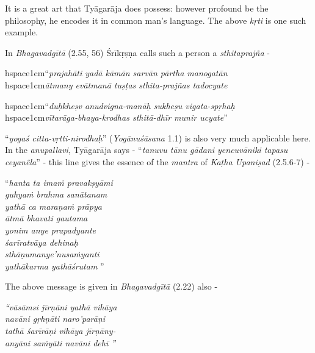 It is a great art that Tyāgarāja does possess: however profound be the philosophy, he encodes it in common man’s language. The above \textit{kṛti} is one such example. 

In \textit{Bhagavadgītā} (2.55, 56) Śrīkṛṣṇa calls such a person a \textit{sthitaprajña} -

\begin{myquote}
hspace{1cm}“\textit{prajahāti yadā kāmān sarvān pārtha manogatān }\\ hspace{1cm}\textit{ātmany evātmanā tuṣṭas sthita-prajñas tadocyate} 
\end{myquote}

\begin{myquote}
hspace{1cm}“\textit{duḥkheṣv anudvigna-manāḥ sukheṣu vigata-spṛhaḥ }\\ hspace{1cm}\textit{vītarāga-bhaya-krodhas sthitā-dhīr munir ucyate}”  
\end{myquote}

“\textit{yogaś citta-vṛtti-nirodhaḥ}” (\textit{Yogānuśāsana} 1.1) is also very much applicable here. In the \textit{anupallavi}, Tyāgarāja says - “\textit{tanuvu tānu gādani yencuvāniki tapasu ceyanêla}” - this line gives the essence of the \textit{mantra} of \textit{Kaṭha Upaniṣad} (2.5.6-7) -

\begin{centerquote}
“\textit{hanta ta imaṁ pravakṣyāmi}\\ \textit{guhyaṁ brahma sanātanam }\\ \textit{yathā ca maraṇaṁ prāpya}\\ \textit{ātmā bhavati gautama }\\ \textit{yonim anye prapadyante}\\ \textit{śarīratvāya dehinaḥ }\\ \textit{sthāṇumanye’nusaṁyanti}\\ \textit{yathākarma yathāśrutam} ”
\end{centerquote}

The above message is given in \textit{Bhagavadgītā} (2.22) also -

\begin{centerquote}
\textit{“vāsāmsi jīrṇāni yathā vihāya}\\ \textit{navāni gṛhṇāti naro’parāṇi }\\ \textit{tathā śarīrāṇi vihāya jīrṇāny-}\\ \textit{anyāni saṁyāti navāni dehī ”}
\end{centerquote}

